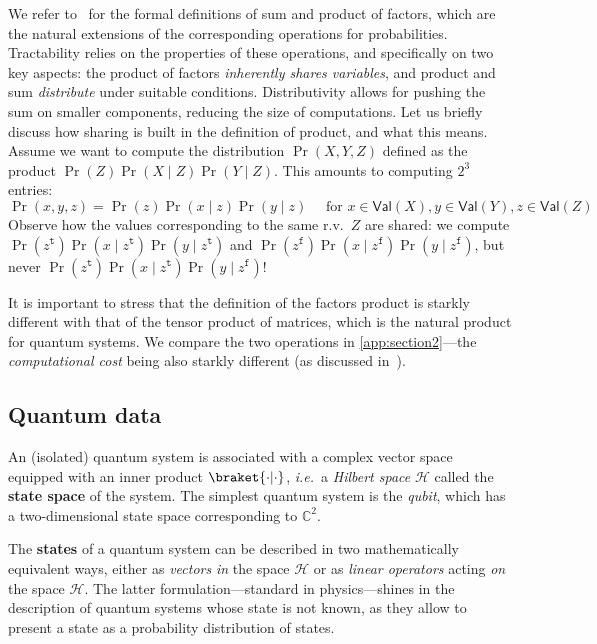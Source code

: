 \documentclass[10pt,a4paper]{article}
\newcommand*{\ie}{\emph{i.e.}\xspace}
\newcommand*{\definitive}[1]{\textbf{#1}}
\newcommand{\true}{\mathtt{t}}
\newcommand{\false}{\mathtt{f}}
\newcommand*{\setofrv}[1]{\mathsf{Val}(#1)}
\newcommand*{\C}{\mathbb{C}}
\newcommand{\HH}{\mathcal{H}}
\newcommand{\rv}{r.v.\xspace}
\begin{document}
We refer to~\cite{DarwicheHandbook} for the formal definitions of sum and product of factors, which are the natural extensions of the corresponding operations for probabilities.
Tractability relies on the properties of these operations, and specifically on two key aspects: the product of factors \emph{inherently shares variables}, and product and sum \emph{distribute} under suitable conditions. Distributivity allows for pushing the sum on smaller components, reducing the size of computations.
Let us briefly discuss how sharing is built in the definition of product, and what this means. 
Assume we want to compute the distribution $\Pr(X,Y,Z)$ defined as the product $ \Pr(Z) \Pr(X \mid Z) \Pr(Y \mid Z)$.
This amounts to computing $2^3$ entries:
\begin{equation*}
\Pr(x,y,z) = \Pr(z) \Pr(x \mid z) \Pr(y \mid z) \quad \text{ for } x\in \setofrv{X}, y\in \setofrv{Y}, z\in \setofrv{Z}
\end{equation*}
Observe how the values corresponding to the same \rv\ $Z$ are shared: we compute $\Pr(z^\true) \Pr(x \mid z^\true) \Pr(y \mid z^\true)$ and $\Pr(z^\false) \Pr(x \mid z^\false) \Pr(y \mid z^\false)$, but never $\Pr(z^\true) \Pr(x \mid z^\true) \Pr(y \mid z^\false)$!

It is important to stress that the definition of the factors product is starkly different with that of the tensor product of matrices, which is the natural product for quantum systems.
We compare the two operations in \cref{app:section2}---the \emph{computational cost} being also starkly different (as discussed in~\cite[Example~9.7]{popl24}).

\subsection{Quantum data}

An (isolated) quantum system is associated with a complex vector space equipped with an inner product $\braket{\cdot | \cdot}$, \ie\ a \emph{Hilbert space} $\HH$ called the \definitive{state space} of the system.
The simplest quantum system is the \emph{qubit}, which has a two-dimensional state space corresponding to $\C^2$.

The \textbf{states} of a quantum system can be described in two mathematically equivalent ways, either as \emph{vectors} \emph{in} the space $\HH$ or as \emph{linear operators} acting \emph{on} the space $\HH$.
The latter formulation---standard in physics---shines in the description of quantum systems whose state is not known, as they allow to present a state as a probability distribution of states.
\end{document}
